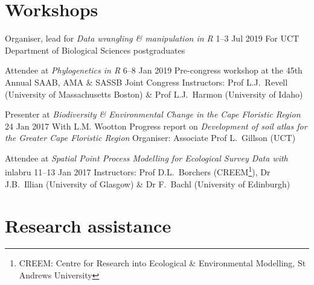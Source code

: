\documentclass[10pt]{article}
\begin{document}
\section*{Workshops} %

\begin{hangparas}{2em}{1}

Organiser, lead for \textit{Data wrangling \& manipulation in R}
                                                     \hfill 1--3 Jul 2019 \break
For UCT Department of Biological Sciences postgraduates

Attendee at \textit{Phylogenetics in R}              \hfill 6--8 Jan 2019 \break
Pre-congress workshop at the 45th Annual SAAB, AMA \& SASSB Joint Congress\break
Instructors:
  Prof L.J.~Revell (University of Massachusetts Boston)                   \break
  \& Prof L.J.~Harmon (University of Idaho)

Presenter at \textit{Biodiversity \& Environmental Change in the Cape 
Floristic Region}                                      \hfill 24 Jan 2017 \break
With L.M. Wootton                                                         \break
Progress report on \textit{Development of soil atlas for the 
Greater Cape Floristic Region}                                            \break
Organiser: Associate Prof L.~Gillson (UCT)

Attendee at \textit{Spatial Point Process Modelling for Ecological 
Survey Data with} inlabru                          \hfill 11--13 Jan 2017 \break
Instructors:
  Prof D.L.~Borchers (CREEM\footnote{CREEM: Centre for Research into Ecological \& Environmental Modelling, St Andrews University}),
  Dr J.B.~Illian (University of Glasgow)                                \break
  \& Dr F.~Bachl (University of Edinburgh)

\hfill

\end{hangparas}

\section*{Research assistance} %
\end{document}
